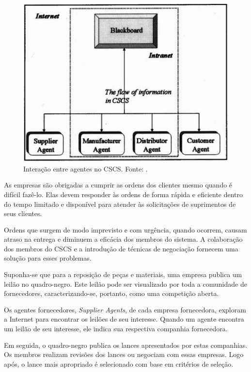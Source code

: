 \begin{description}
\begin{figure}[h!]
    \centering
    \includegraphics[scale=0.30]{figuras/blackboard/blackboard_example.png}
    \caption{Interação entre agentes no CSCS. Fonte: .}
    \label{fig:blackboard_example}
\end{figure}

As empresas são obrigadas a cumprir as ordens dos clientes mesmo quando é difícil fazê-lo. Elas devem responder às ordens de forma rápida e eficiente dentro do tempo limitado e disponível para atender às solicitações de suprimentos de seus clientes.

Ordens que surgem de modo imprevisto e com urgência, quando ocorrem, causam atraso na entrega e diminuem a eficácia dos membros do sistema. A colaboração dos membros do CSCS e a introdução de técnicas de negociação fornecem uma solução para esses problemas.

Suponha-se que para a reposição de peças e materiais, uma empresa publica um leilão no quadro-negro. Este leilão pode ser visualizado por toda a comunidade de fornecedores, caracterizando-se, portanto, como uma competição aberta. 

Os agentes fornecedores, \textit{Supplier Agents}, de cada empresa fornecedora, exploram a Internet para encontrar os leilões de seu interesse. Quando um agente encontra um leilão de seu interesse, ele indica sua respectiva companhia fornecedora.

Em seguida, o quadro-negro publica os lances apresentados por estas companhias. Os membros realizam revisões dos lances ou negociam com essas empresas. Logo após, o lance mais apropriado é selecionado com base em critérios de seleção. 


\end{description}
